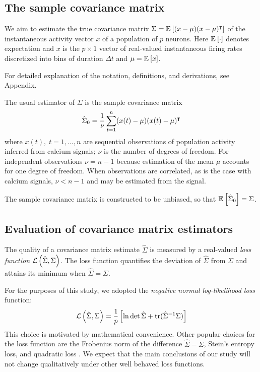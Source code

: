 \subsection*{The sample covariance matrix}
We aim to estimate the true covariance matrix $\Sigma = \mathbb E_{}\left[ (x-\mu)(x-\mu)^\intercal\right]$ of the instantaneous activity vector $x$ of a population of $p$ neurons. Here $\mathbb E_{}\left[ \cdot\right]$ denotes expectation  and $x$ is the $p\times 1$ vector of real-valued instantaneous firing rates discretized into bins of duration $\Delta t$ and $\mu = \mathbb E_{}\left[ x\right]$.  

For detailed explanation of the notation, definitions, and derivations, see Appendix. 

The usual estimator of $\Sigma$ is the sample covariance matrix
\begin{equation}
\hat \Sigma_0 = \frac 1 \nu \sum\limits_{t=1}^n (x(t)-\mu)(x(t)-\mu)^\intercal 
\end{equation}
where $x(t),\;t=1,\ldots,n$ are sequential observations of population activity inferred from calcium signals; $\nu$ is the number of degrees of freedom. For independent observations $\nu=n-1$ because estimation of the mean $\mu$ accounts for one degree of freedom. When observations are correlated, as is the case with calcium signals, $\nu < n-1$ and may be estimated from the signal. 

The sample covariance matrix is constructed to be unbiased, so that $\mathbb E_{}\left[ \hat\Sigma_0\right] = \Sigma$. 

\subsection*{Evaluation of covariance matrix estimators}
The quality of a covariance matrix estimate $\hat\Sigma$ is measured by a real-valued \emph{loss function} $\mathcal L\left(\hat\Sigma,\Sigma\right)$.  The loss function quantifies the deviation of $\hat\Sigma$ from $\Sigma$ and attains its minimum  when $\hat\Sigma = \Sigma$.  

For the purposes of this study, we adopted the \emph{negative normal log-likelihood loss} function:
\begin{equation}\label{eq:loss}
\mathcal L\left(\hat\Sigma,\Sigma\right) = \frac 1 p\left[\ln \det \hat \Sigma + \operatorname{tr}(\hat \Sigma^{-1}\Sigma)\right]
\end{equation}
This choice is motivated by mathematical convenience. Other popular choices for the loss function are the Frobenius norm of the difference $\hat\Sigma-\Sigma$, Stein's entropy loss, and quadratic loss \cite{James:1961,Ledoit:2004,Schafer:2005,Fan:2008}.  We expect that the main conclusions of our study will not change qualitatively under other well behaved loss functions.


